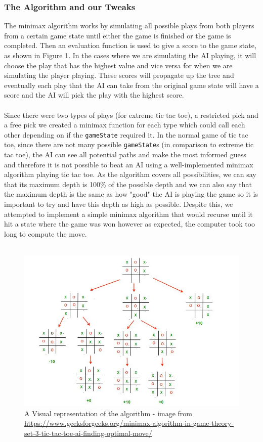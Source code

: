 \documentclass[11pt]{article}
\begin{document}
\subsubsection{The Algorithm and our Tweaks}
The minimax algorithm works by simulating all possible plays from both players from a certain game state until either the game is finished or the game is completed. Then an evaluation function is used to give a score to the game state, as shown in Figure 1. In the cases where we are simulating the AI playing, it will choose the play that has the highest value and vice versa for when we are simulating the player playing. These scores will propagate up the tree and eventually each play that the AI can take from the original game state will have a score and the AI will pick the play with the highest score.
\\\\Since there were two types of plays (for extreme tic tac toe), a restricted pick and a free pick we created a minimax function for each type which could call each other depending on if the {\tt{gameState}} required it. In the normal game of tic tac toe, since there are not many possible {\tt{gameState}}s (in comparison to extreme tic tac toe), the AI can see all potential paths and make the most informed guess and therefore it is not possible to beat an AI using a well-implemented minimax algorithm playing tic tac toe. As the algorithm covers all possibilities, we can say that its maximum depth is 100\% of the possible depth and we can also say that the maximum depth is the same as how "good" the AI is playing the game so it is important to try and have this depth as high as possible. Despite this, we attempted to implement a simple minimax algorithm that would recurse until it hit a state where the game was won however as expected, the computer took too long to compute the move.
\\\\
\begin{figure}
	\includegraphics[scale = 0.5]{minimax.jpeg}
	\caption{A Visual representation of the algorithm - image from \url{https://www.geeksforgeeks.org/minimax-algorithm-in-game-theory-set-3-tic-tac-toe-ai-finding-optimal-move/}}
\end{figure}
\end{document}
